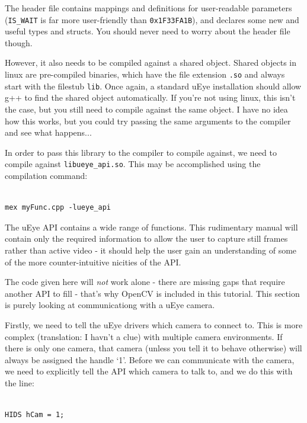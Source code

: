 \documentclass[12pt,a4paper]{article}
\begin{document}
The header file contains mappings and definitions for user-readable parameters (\texttt{IS\_WAIT} is far more user-friendly than \texttt{0x1F33FA1B}), and declares some new and useful types and structs. You should never need to worry about the header file though.

However, it also needs to be compiled against a shared object. Shared objects in linux are pre-compiled binaries, which have the file extension \texttt{.so} and always start with the filestub \texttt{lib}. Once again, a standard uEye installation should allow g++ to find the shared object automatically. If you're not using linux, this isn't the case, but you still need to compile against the same object. I have no idea how this works, but you could try passing the same arguments to the compiler and see what happens...

In order to pass this library to the compiler to compile against, we need to compile against \texttt{libueye\_api.so}. This may be accomplished using the compilation command:

\lstset{language=matlab}
\begin{lstlisting}

mex myFunc.cpp -lueye_api

\end{lstlisting}

The uEye API contains a wide range of functions. This rudimentary manual will contain only the required information to allow the user to capture still frames rather than active video - it should help the user gain an understanding of some of the more counter-intuitive nicities of the API.

The code given here will \emph{not} work alone - there are missing gaps that require another API to fill - that's why OpenCV is included in this tutorial. This section is purely looking at communicationg with a uEye camera.

Firstly, we need to tell the uEye drivers which camera to connect to. This is more complex (translation: I havn't a clue) with multiple camera environments. If there is only one camera, that camera (unless you tell it to behave otherwise) will always be assigned the handle `1'. Before we can communicate with the camera, we need to explicitly tell the API which camera to talk to, and we do this with the line:

\lstset{language=C++}
\begin{lstlisting}

HIDS hCam = 1;

\end{lstlisting}
\end{document}
